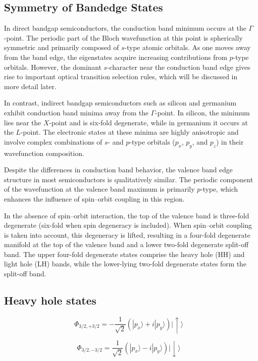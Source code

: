 \subsection{Symmetry of Bandedge States}
In direct bandgap semiconductors, the conduction band minimum occurs at the \( \Gamma \)-point. The periodic part of the Bloch wavefunction at this point is spherically symmetric and primarily composed of \( s \)-type atomic orbitals. As one moves away from the band edge, the eigenstates acquire increasing contributions from \( p \)-type orbitals. However, the dominant \( s \)-character near the conduction band edge gives rise to important optical transition selection rules, which will be discussed in more detail later.

In contrast, indirect bandgap semiconductors such as silicon and germanium exhibit conduction band minima away from the \( \Gamma \)-point. In silicon, the minimum lies near the \( X \)-point and is six-fold degenerate, while in germanium it occurs at the \( L \)-point. The electronic states at these minima are highly anisotropic and involve complex combinations of \( s \)- and \( p \)-type orbitals (\( p_x \), \( p_y \), and \( p_z \)) in their wavefunction composition.

Despite the differences in conduction band behavior, the valence band edge structure in most semiconductors is qualitatively similar. The periodic component of the wavefunction at the valence band maximum is primarily \( p \)-type, which enhances the influence of spin–orbit coupling in this region.

In the absence of spin–orbit interaction, the top of the valence band is three-fold degenerate (six-fold when spin degeneracy is included). When spin–orbit coupling is taken into account, this degeneracy is lifted, resulting in a four-fold degenerate manifold at the top of the valence band and a lower two-fold degenerate split-off band. The upper four-fold degenerate states comprise the heavy hole (HH) and light hole (LH) bands, while the lower-lying two-fold degenerate states form the split-off band.
\subsection*{Heavy hole states}
\begin{equation}
	\boxed{
		\Phi_{3/2, +3/2} = -\frac{1}{\sqrt{2}} \left( |p_x\rangle + i |p_y\rangle \right) |\uparrow\rangle
	}
\end{equation}

\begin{equation}
	\boxed{
		\Phi_{3/2, -3/2} = \frac{1}{\sqrt{2}} \left( |p_x\rangle - i |p_y\rangle \right) |\downarrow\rangle
	}
\end{equation}

